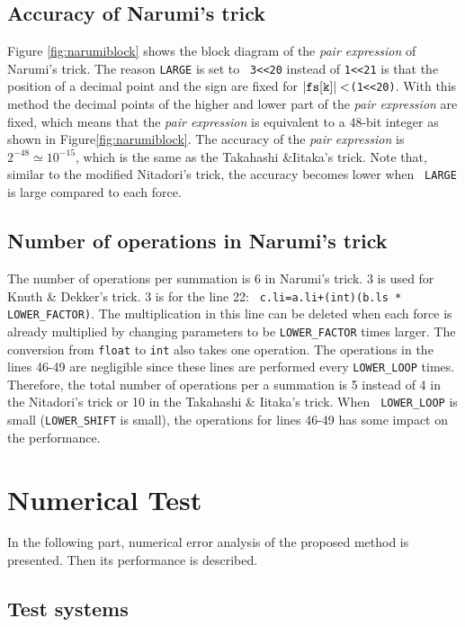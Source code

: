 \subsection{Accuracy of Narumi's trick}

Figure \ref{fig:narumiblock} shows the block diagram of the {\it pair
expression} of Narumi's trick. The reason {\tt LARGE} is set to {\tt
  3<<20} instead of {\tt 1<<21} is that the position of a decimal point 
and the sign are fixed for $|{\tt fs[k]}|<${\tt (1<<20)}. With this method 
the decimal points of the higher and lower part of the {\it pair 
expression} are fixed, which means that the {\it pair expression} is 
equivalent to a 48-bit integer as shown in Figure\ref{fig:narumiblock}. 
The accuracy of the {\it pair expression} is$2^{-48}\simeq 10^{-15}$, 
which is the same as the Takahashi \&Iitaka's trick. Note that, similar 
to the modified Nitadori's trick, the accuracy becomes lower when {\tt 
LARGE} is large compared to each force.

\subsection{Number of operations in Narumi's trick}

The number of operations per summation is 6 in Narumi's trick. 3 is
used for Knuth \& Dekker's trick.  3 is for the line 22: {\tt
  c.li=a.li+(int)(b.ls * LOWER\_FACTOR)}.  The
multiplication in this line can be deleted when each force is already
multiplied by changing parameters to be {\tt LOWER\_FACTOR} times
larger. The conversion from {\tt float} to {\tt int} also takes one
operation. The operations in the lines 46-49 are negligible since these
lines are performed every {\tt LOWER\_LOOP} times.  Therefore, the
total number of operations per a summation is 5 instead of 4 in the
Nitadori's trick or 10 in the Takahashi \& Iitaka's trick.  When {\tt
  LOWER\_LOOP} is small ({\tt LOWER\_SHIFT} is small), the
operations for lines 46-49 has some impact on the performance.



\section{Numerical Test}\label{sec:numerical}

In the following part, numerical error analysis of the proposed method 
is presented. Then its performance is described.

\subsection{Test systems}

